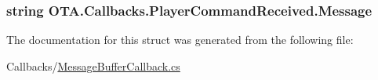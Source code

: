 \subsubsection[{Message}]{\setlength{\rightskip}{0pt plus 5cm}string O\+T\+A.\+Callbacks.\+Player\+Command\+Received.\+Message}\label{struct_o_t_a_1_1_callbacks_1_1_player_command_received_aae7bbe0aa055931738d97ff219971f59}


The documentation for this struct was generated from the following file\+:\begin{DoxyCompactItemize}
\item 
Callbacks/\hyperlink{_message_buffer_callback_8cs}{Message\+Buffer\+Callback.\+cs}\end{DoxyCompactItemize}
